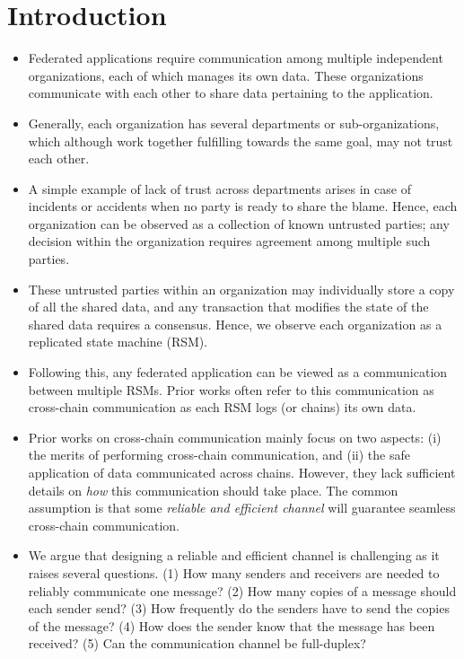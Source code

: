 \section{Introduction}
\begin{itemize}
\item Federated applications require communication among multiple independent organizations, 
each of which manages its own data. 
These organizations communicate with each other to share data pertaining to the application.

\item Generally, each organization has several departments or sub-organizations, which although 
work together fulfilling towards the same goal, may not trust each other.

\item A simple example of lack of trust across departments arises in case of incidents or accidents when 
no party is ready to share the blame. 
Hence, each organization can be observed as a collection of known untrusted parties; 
any decision within the organization requires agreement among multiple such parties.

\item These untrusted parties within an organization may individually store a copy of all the shared data, 
and any transaction that modifies the state of the shared data requires a consensus. 
Hence, we observe each organization as a replicated state machine (RSM).

\item Following this, any federated application can be viewed as a communication between 
multiple RSMs. 
Prior works often refer to this communication as cross-chain communication as 
each RSM logs (or chains) its own data.

\item Prior works on cross-chain communication mainly focus on two aspects:
(i) the merits of performing cross-chain communication, and 
(ii) the safe application of data communicated across chains. 
However, they lack sufficient details on {\em how} this communication should take place.
The common assumption is that some {\em reliable and efficient channel} will guarantee seamless 
cross-chain communication.

\item We argue that designing a reliable and efficient channel is challenging as it raises 
several questions. 
(1) How many senders and receivers are needed to reliably communicate one message? 
(2) How many copies of a message should each sender send?
(3) How frequently do the senders have to send the copies of the message?
(4) How does the sender know that the message has been received?
(5) Can the communication channel be full-duplex?


\end{itemize}
